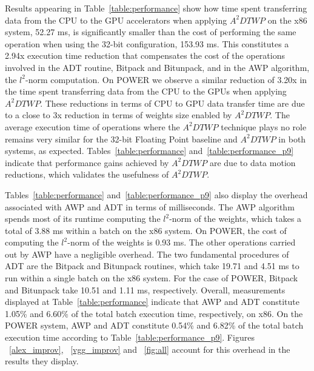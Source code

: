 Results appearing in Table~\ref{table:performance} show how time spent transferring 
data from the CPU to the GPU accelerators when applying $A^2DTWP$ on the x86 system, 52.27 ms, 
is significantly smaller than the cost of performing the same operation when using the 32-bit configuration, 153.93 ms. 
This constitutes a 2.94x execution time reduction that compensates the cost of the operations involved in the ADT routine, Bitpack and
Bitunpack, and in the AWP algorithm, the $l^2$-norm computation.
On POWER we observe a similar reduction of 3.20x in the time spent transferring
data from the CPU to the GPUs when applying $A^2DTWP$.
These reductions in terms of CPU to GPU data transfer time are due to a close to 3x reduction in terms of weights size enabled by $A^2DTWP$.
The average execution time of operations where the $A^2DTWP$ technique plays no role remains very similar for the 32-bit Floating Point baseline and $A^2DTWP$ in both systems, as expected.
Tables~\ref{table:performance} and~\ref{table:performance_p9} indicate that performance gains achieved by $A^2DTWP$ are due to data motion reductions, which validates the usefulness of $A^2DTWP$.

Tables~\ref{table:performance} and~\ref{table:performance_p9} also display the overhead associated with AWP and ADT in terms of milliseconds.
The AWP algorithm spends most of its runtime computing the $l^2$-norm of the weights, which takes a total of 3.88 ms within a batch on the x86 system. 
On POWER, the cost of computing the $l^2$-norm of the weights is 0.93 ms.
The other operations carried out by AWP have a negligible overhead.
The two fundamental procedures of ADT are the Bitpack and Bitunpack routines, which take 19.71 and 4.51 ms to run within a single batch on the x86 system.
For the case of POWER, Bitpack and Bitunpack take 10.51 and 1.11 ms, respectively.
Overall, measurements displayed at Table~\ref{table:performance} indicate that AWP and ADT constitute 1.05\% and 6.60\% of the total batch execution time, respectively, on x86.
On the POWER system, AWP and ADT constitute 0.54\% and 6.82\% of the total batch execution time according to Table~\ref{table:performance_p9}. 
Figures ~\ref{alex_improv}, ~\ref{vgg_improv} and ~\ref{fig:all} account for this overhead in the results they display.

